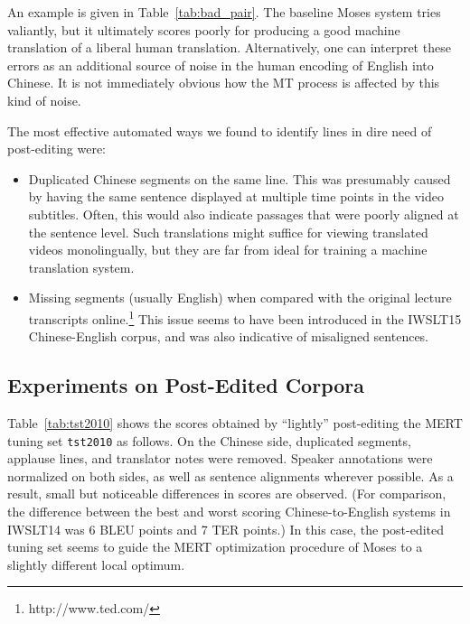 {An example is given in Table~\ref{tab:bad_pair}.
The baseline Moses system tries valiantly, but it ultimately scores poorly for producing a good machine translation of a liberal human translation.
Alternatively, one can interpret these errors as an additional source of noise in the human encoding of English into Chinese.
It is not immediately obvious how the MT process is affected by this kind of noise.

The most effective automated ways we found to identify lines in dire need of post-editing were:
\begin{itemize}
\item 
Duplicated Chinese segments on the same line. 
This was presumably caused by having the same sentence displayed at multiple time points in the video subtitles. 
Often, this would also indicate passages that were poorly aligned at the sentence level.
Such translations might suffice for viewing translated videos monolingually, but they are far from ideal for training a machine translation system.

\item 
Missing segments (usually English) when compared with the original lecture transcripts online.\footnote{http://www.ted.com/} 
This issue seems to have been introduced in the IWSLT15 Chinese-English corpus, and was also indicative of misaligned sentences.
\end{itemize}



\subsection{Experiments on Post-Edited Corpora}
\label{subsec:post_edited}

Table~\ref{tab:tst2010} shows the scores obtained by ``lightly'' post-editing the MERT tuning set {\small \tt tst2010} as follows. 
On the Chinese side, duplicated segments, applause lines, and translator notes were removed. 
Speaker annotations were normalized on both sides, as well as sentence alignments wherever possible.
As a result, small but noticeable differences in scores are observed. 
(For comparison, the difference between the best and worst scoring Chinese-to-English systems in IWSLT14  was 6 BLEU points and 7 TER points.)
In this case, the post-edited tuning set seems to guide the MERT optimization procedure of Moses to a slightly different local optimum.

}
